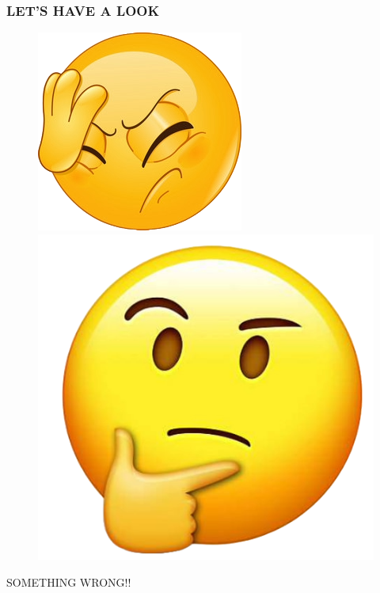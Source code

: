 \documentclass{beamer}
\begin{document}
\begin{frame}
    \frametitle{LET'S HAVE A LOOK}
    \begin{figure}
        \centering
        \begin{minipage}[c]{0.4\textwidth}
            \includegraphics[scale=0.4]{assets/face-palm.png} %
        \end{minipage}
        \hfill
        \begin{minipage}[c]{0.4\textwidth}
        \quad\quad\quad
            \includegraphics[scale=0.25]{assets/thunder.png} %
        \end{minipage}
    \end{figure}

    \begin{center}
        \textcolor{AlertRed}{\Large SOMETHING WRONG!!}
    \end{center}
\end{frame}
\end{document}
